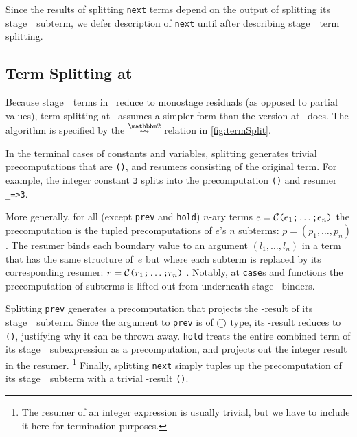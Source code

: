 \begin{abstrsyn}
Since the results of splitting \texttt{next} terms depend on the output of splitting its stage~\bbtwo\ subterm,
we defer description of \texttt{next} until after describing stage~\bbtwo\ term splitting.

\subsection{Term Splitting at \bbtwo}

Because stage~\bbtwo\ terms in \lang\ reduce to monostage residuals (as opposed to partial values),
term splitting at \bbtwo\ assumes a simpler form than the version at \bbonem\ does. 
The algorithm is specified by the $\splittwosym$ relation in \cref{fig:termSplit}.

In the terminal cases of
constants and variables, splitting generates trivial precomputations that are \texttt{()}, and resumers consisting of the original term.
For example, the integer constant \texttt{3} splits into the
precomputation \texttt{()} and resumer \texttt{\_=>3}.

More generally, for all (except \texttt{prev} and \texttt{hold}) 
$n$-ary terms $e = \mathcal{C}\texttt{(} e_1 \texttt{;} \ldots \texttt{;} e_n \texttt{)}$ 
the precomputation is the tupled precomputations of $e$'s $n$ subterms:
$p=(p_1,\ldots,p_n)$.  The resumer binds each boundary value to an
argument $(l_1,\ldots,l_n)$ in a term that has the same structure
of~$e$ but where each subterm is replaced by its corresponding resumer:
$r = \mathcal{C}\texttt{(} r_1 \texttt{;} \ldots \texttt{;} r_n \texttt{)}$ .
Notably, at \texttt{case}s and functions the
precomputation of subterms is lifted out from underneath stage \bbtwo\ binders.  

Splitting \texttt{prev} generates a precomputation that projects the \bbone-result of its stage~\bbone\ subterm.
Since the argument to \texttt{prev} is of $\bigcirc$ type, its \bbone-result reduces to \texttt{()}, justifying why it can be thrown away.
\texttt{hold} treats the entire combined term of its stage~\bbone\ subexpression as a precomputation, 
and projects out the integer result in the resumer. 
\footnote{The resumer of an integer expression is usually trivial, 
but we have to include it here for termination purposes.} 
Finally, splitting \texttt{next} simply tuples up the precomputation of its stage~\bbtwo\ subterm with a trivial \bbone-result \texttt{()}.

\end{abstrsyn}



